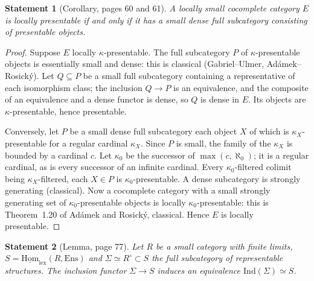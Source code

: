 \documentclass[11pt]{article}
\theoremstyle{plain}
\newtheorem*{enonce}{Statement}
\theoremstyle{definition}
\theoremstyle{remark}
\begin{document}
\begin{enonce}[Corollary, pages 60 and 61]
A locally small cocomplete category $E$ is locally presentable if and only if it has a small dense full subcategory consisting of presentable objects.
\end{enonce}

\begin{proof}
Suppose $E$ locally $\kappa$-presentable. The full subcategory $P$ of $\kappa$-presentable objects is essentially small and dense: this is classical (Gabriel--Ulmer, Adámek--Rosický). Let $Q \subseteq P$ be a small full subcategory containing a representative of each isomorphism class; the inclusion $Q \to P$ is an equivalence, and the composite of an equivalence and a dense functor is dense, so $Q$ is dense in $E$. Its objects are $\kappa$-presentable, hence presentable.

Conversely, let $P$ be a small dense full subcategory each object $X$ of which is $\kappa_X$-presentable for a regular cardinal $\kappa_X$. Since $P$ is small, the family of the $\kappa_X$ is bounded by a cardinal $c$. Let $\kappa_0$ be the successor of $\max(c, \aleph_0)$; it is a regular cardinal, as is every successor of an infinite cardinal. Every $\kappa_0$-filtered colimit being $\kappa_X$-filtered, each $X \in P$ is $\kappa_0$-presentable. A dense subcategory is strongly generating (classical). Now a cocomplete category with a small strongly generating set of $\kappa_0$-presentable objects is locally $\kappa_0$-presentable: this is Theorem~1.20 of Adámek and Rosický, classical. Hence $E$ is locally presentable.
\end{proof}

\begin{enonce}[Lemma, page 77]
Let $R$ be a small category with finite limits, $S = \underline{\mathrm{Hom}}_{\mathrm{lex}}(R, \mathrm{Ens})$ and $\Sigma \simeq R^\circ \subset S$ the full subcategory of representable structures. The inclusion functor $\Sigma \to S$ induces an equivalence $\mathrm{Ind}(\Sigma) \simeq S$.
\end{enonce}
\end{document}
